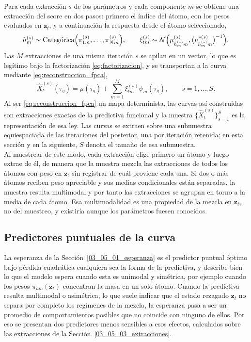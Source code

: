 Para cada extracción $s$ de los parámetros y cada componente $m$ se obtiene una extracción del score en dos pasos: primero el índice del átomo, con los pesos evaluados en $\mathbf{z}_t$, y a continuación la respuesta desde el átomo seleccionado,
\begin{equation}\label{eq:extraccion_score}
    h_m^{(s)} \sim \text{Categórica}\Bigl(\pi_{1m}^{(s)}, \dots, \pi_{Nm}^{(s)}\Bigr),
    \qquad
    \xi_{tm}^{(s)} \sim \mathcal{N}\Bigl(\mu_{h_m^{(s)}m}^{(s)},
    \bigl(\nu_{h_m^{(s)}m}^{*(s)}\bigr)^{-1}\Bigr).
\end{equation}
Las $M$ extracciones de una misma iteración $s$ se apilan en un vector, lo que es legítimo bajo la factorización \eqref{eq:factorizacion}, y se transportan a la curva mediante \eqref{eq:reconstruccion_fpca},
\begin{equation}\label{eq:extraccion_curva}
    \widehat{X}_{t}^{(s)}(\tau_g) = \mu(\tau_g)
    + \sum_{m=1}^{M} \xi_{tm}^{(s)}\psi_m(\tau_g),
    \qquad s = 1, \dots, S.
\end{equation}
Al ser \eqref{eq:reconstruccion_fpca} un mapa determinista, las curvas así construidas son extracciones exactas de la predictiva funcional y la muestra $\{\widehat{X}_t^{(s)}\}_{s=1}^{S}$ es la representación de esa ley. Las curvas se extraen sobre una submuestra equiespaciada de las iteraciones del posterior, una por iteración retenida; en esta sección y en la siguiente, $S$ denota el tamaño de esa submuestra.\\

Al muestrear de este modo, cada extracción elige primero un átomo y luego extrae de él, de manera que la muestra mezcla las extracciones de todos los átomos con peso en $\mathbf{z}_t$ sin registrar de cuál proviene cada una. Si dos o más átomos reciben peso apreciable y sus medias condicionales están separadas, la muestra resulta multimodal y por tanto las extracciones se agrupan en torno a la media de cada átomo. Esa multimodalidad es una propiedad de la mezcla en $\mathbf{z}_t$, no del muestreo, y existiría aunque los parámetros fuesen conocidos. 

\subsection{Predictores puntuales de la curva}
\label{03_05_04_predictores_puntuales}

La esperanza de la Sección~\ref{03_05_01_esperanza} es el predictor puntual óptimo bajo pérdida cuadrática cualquiera sea la forma de la predictiva, y describe bien lo que el modelo espera cuando esta es unimodal y simétrica, por ejemplo cuando los pesos $\pi_{hm}(\mathbf{z}_t)$ concentran la masa en un solo átomo. Cuando la predictiva resulta multimodal o asimétrica, lo que suele indicar que el estado rezagado $\mathbf{z}_t$ no separa por completo los regímenes de la mezcla, la esperanza pasa a ser un promedio de comportamientos posibles que no coincide con ninguno de ellos. Por eso se presentan dos predictores menos sensibles a esos efectos, calculados sobre las extracciones de la Sección~\ref{03_05_03_extracciones}.
 

